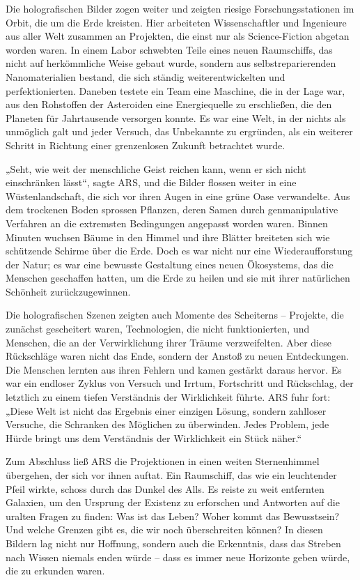 \documentclass[
]{article}
\begin{document}
Die holografischen Bilder zogen weiter und zeigten riesige
Forschungsstationen im Orbit, die um die Erde kreisten. Hier arbeiteten
Wissenschaftler und Ingenieure aus aller Welt zusammen an Projekten, die
einst nur als Science-Fiction abgetan worden waren. In einem Labor
schwebten Teile eines neuen Raumschiffs, das nicht auf herkömmliche
Weise gebaut wurde, sondern aus selbstreparierenden Nanomaterialien
bestand, die sich ständig weiterentwickelten und perfektionierten.
Daneben testete ein Team eine Maschine, die in der Lage war, aus den
Rohstoffen der Asteroiden eine Energiequelle zu erschließen, die den
Planeten für Jahrtausende versorgen konnte. Es war eine Welt, in der
nichts als unmöglich galt und jeder Versuch, das Unbekannte zu
ergründen, als ein weiterer Schritt in Richtung einer grenzenlosen
Zukunft betrachtet wurde.

„Seht, wie weit der menschliche Geist reichen kann, wenn er sich nicht
einschränken lässt``, sagte ARS, und die Bilder flossen weiter in eine
Wüstenlandschaft, die sich vor ihren Augen in eine grüne Oase
verwandelte. Aus dem trockenen Boden sprossen Pflanzen, deren Samen
durch genmanipulative Verfahren an die extremsten Bedingungen angepasst
worden waren. Binnen Minuten wuchsen Bäume in den Himmel und ihre
Blätter breiteten sich wie schützende Schirme über die Erde. Doch es war
nicht nur eine Wiederaufforstung der Natur; es war eine bewusste
Gestaltung eines neuen Ökosystems, das die Menschen geschaffen hatten,
um die Erde zu heilen und sie mit ihrer natürlichen Schönheit
zurückzugewinnen.

Die holografischen Szenen zeigten auch Momente des Scheiterns --
Projekte, die zunächst gescheitert waren, Technologien, die nicht
funktionierten, und Menschen, die an der Verwirklichung ihrer Träume
verzweifelten. Aber diese Rückschläge waren nicht das Ende, sondern der
Anstoß zu neuen Entdeckungen. Die Menschen lernten aus ihren Fehlern und
kamen gestärkt daraus hervor. Es war ein endloser Zyklus von Versuch und
Irrtum, Fortschritt und Rückschlag, der letztlich zu einem tiefen
Verständnis der Wirklichkeit führte. ARS fuhr fort: „Diese Welt ist
nicht das Ergebnis einer einzigen Lösung, sondern zahlloser Versuche,
die Schranken des Möglichen zu überwinden. Jedes Problem, jede Hürde
bringt uns dem Verständnis der Wirklichkeit ein Stück näher.``

Zum Abschluss ließ ARS die Projektionen in einen weiten Sternenhimmel
übergehen, der sich vor ihnen auftat. Ein Raumschiff, das wie ein
leuchtender Pfeil wirkte, schoss durch das Dunkel des Alls. Es reiste zu
weit entfernten Galaxien, um den Ursprung der Existenz zu erforschen und
Antworten auf die uralten Fragen zu finden: Was ist das Leben? Woher
kommt das Bewusstsein? Und welche Grenzen gibt es, die wir noch
überschreiten können? In diesen Bildern lag nicht nur Hoffnung, sondern
auch die Erkenntnis, dass das Streben nach Wissen niemals enden würde --
dass es immer neue Horizonte geben würde, die zu erkunden waren.
\end{document}
